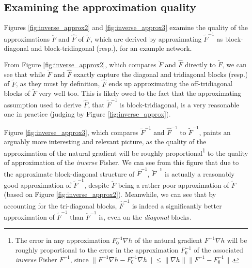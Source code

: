 \documentclass[12pt]{article}
\newcommand{\ovec}{\operatorname{vec}}
\begin{document}


\subsection{Examining the approximation quality}
\label{sec:extra_quality_figs}

Figures \ref{fig:inverse_approx2} and \ref{fig:inverse_approx3} examine the quality of the approximations $\breve{F}$ and $\hat{F}$ of $\tilde{F}$, which are derived by approximating $\tilde{F}^{-1}$ as block-diagonal and block-tridiagonal (resp.), for an example network.  

From Figure \ref{fig:inverse_approx2}, which compares $\breve{F}$ and $\hat{F}$ directly to $\tilde{F}$, we can see that while $\breve{F}$ and $\hat{F}$ exactly capture the diagonal and tridiagonal blocks (resp.) of $\tilde{F}$, as they must by definition, $\hat{F}$ ends up approximating the off-tridiagonal blocks of $\tilde{F}$ very well too.  This is likely owed to the fact that the approximating assumption used to derive $\hat{F}$, that $\tilde{F}^{-1}$ is block-tridiagonal, is a very reasonable one in practice (judging by Figure \ref{fig:inverse_approx}).

Figure \ref{fig:inverse_approx3}, which compares $\breve{F}^{-1}$ and $\hat{F}^{-1}$ to $\tilde{F}^{-1}$, paints an arguably more interesting and relevant picture, as the quality of the approximation of the natural gradient will be roughly proportional\footnote{The error in any approximation $F_0^{-1}\nabla h$ of the natural gradient $F^{-1}\nabla h$ will be roughly proportional to the error in the approximation $F_0^{-1}$ of the associated \emph{inverse} Fisher $F^{-1}$, since $\|F^{-1}\nabla h - F_0^{-1}\nabla h\| \leq \|\nabla h\| \|F^{-1} - F_0^{-1}\|$.} to the quality of approximation of the \emph{inverse} Fisher.  We can see from this figure that due to the approximate block-diagonal structure of $\tilde{F}^{-1}$, $\breve{F}^{-1}$ is actually a reasonably good approximation of $\tilde{F}^{-1}$, despite $\breve{F}$ being a rather poor approximation of $\tilde{F}$ (based on Figure \ref{fig:inverse_approx2}).  Meanwhile, we can see that by accounting for the tri-diagonal blocks, $\hat{F}^{-1}$ is indeed a significantly better approximation of $\tilde{F}^{-1}$ than $\breve{F}^{-1}$ is, even on the \emph{diagonal} blocks.
\end{document}
